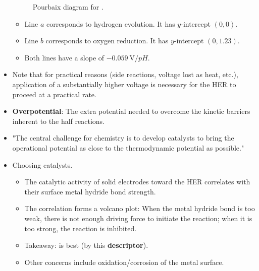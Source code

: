 \documentclass[../notes.tex]{subfiles}
\begin{document}
\begin{itemize}
\begin{figure}[h!]
        \caption{Pourbaix diagram for .}
        \label{fig:PourbaixH2O}
    \end{figure}
    \begin{itemize}
        \item Line $a$ corresponds to hydrogen evolution. It has $y$-intercept $(0,0)$.
        \item Line $b$ corresponds to oxygen reduction. It has $y$-intercept $(0,1.23)$.
        \item Both lines have a slope of $-\SI{0.059}{\volt\per pH}$.
    \end{itemize}
    \item Note that for practical reasons (side reactions, voltage lost as heat, etc.), application of a substantially higher voltage is necessary for the HER to proceed at a practical rate.
    \item \textbf{Overpotential}: The extra potential needed to overcome the kinetic barriers inherent to the half reactions.
    \item "The central challenge for chemistry is to develop catalysts to bring the operational potential as close to the thermodynamic potential as possible."
    \item Choosing catalysts.
    \begin{itemize}
        \item The catalytic activity of solid electrodes toward the HER correlates with their surface metal hydride bond strength.
        \item The correlation forms a volcano plot: When the metal hydride bond is too weak, there is not enough driving force to initiate the reaction; when it is too strong, the reaction is inhibited.
        \item Takeaway:  is best (by this \textbf{descriptor}).
        \item Other concerns include oxidation/corrosion of the metal surface.

\end{itemize}
\end{itemize}
\end{document}
